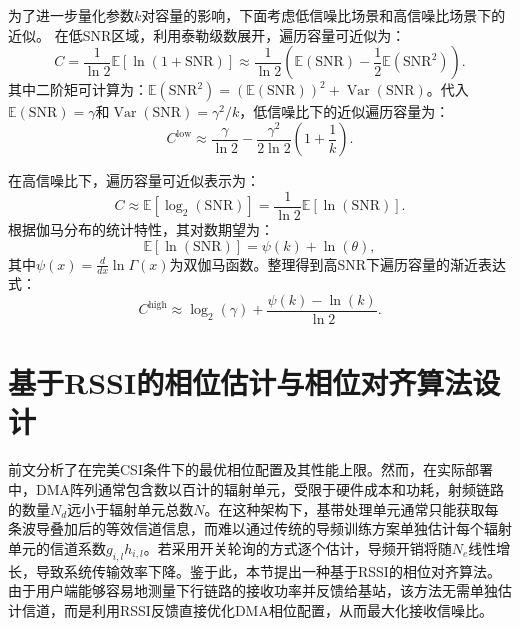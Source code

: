 为了进一步量化参数$k$对容量的影响，下面考虑低信噪比场景和高信噪比场景下的近似。
在低SNR区域，利用泰勒级数展开，遍历容量可近似为：
\begin{equation}
	C = \frac{1}{\ln 2} \mathbb{E}\left[ \ln(1 + \mathrm{SNR}) \right]
	\approx \frac{1}{\ln 2} \left( \mathbb{E}(\mathrm{SNR}) - \frac{1}{2}\mathbb{E}(\mathrm{SNR}^2) \right).
\end{equation}
其中二阶矩可计算为：$\mathbb{E}(\mathrm{SNR}^2)=(\mathbb{E}(\mathrm{SNR}))^2+\operatorname{Var}(\mathrm{SNR})$。代入$\mathbb{E}(\mathrm{SNR})=\gamma$和$\operatorname{Var}(\mathrm{SNR})=\gamma^2/k$，低信噪比下的近似遍历容量为：
\begin{equation}\label{eq:cdma_capacity_low_snr}
	C^{\text{low}} \approx \frac{\gamma}{\ln 2} - \frac{\gamma^2}{2 \ln 2} \left( 1 + \frac{1}{k} \right).
\end{equation}

在高信噪比下，遍历容量可近似表示为：
\begin{equation}
	C \approx \mathbb{E}\left[ \log_2(\mathrm{SNR}) \right] = \frac{1}{\ln 2} \mathbb{E}\left[ \ln(\mathrm{SNR}) \right].
\end{equation}
根据伽马分布的统计特性，其对数期望为：
\begin{equation}
	\mathbb{E}[\ln(\mathrm{SNR})] = \psi(k) + \ln(\theta),
\end{equation}
其中$\psi(x) = \frac{d}{dx}\ln \Gamma(x)$为双伽马函数。整理得到高SNR下遍历容量的渐近表达式：
\begin{equation}\label{eq:cdma_capacity_high_snr}
	C^{\text{high}}
	\approx \log_2(\gamma) + \frac{\psi(k) - \ln(k)}{\ln 2}.
\end{equation}


\section{基于RSSI的相位估计与相位对齐算法设计}\label{sec:cdma_rssi}

前文分析了在完美CSI条件下的最优相位配置及其性能上限。然而，在实际部署中，DMA阵列通常包含数以百计的辐射单元，受限于硬件成本和功耗，射频链路的数量$N_d$远小于辐射单元总数$N$。在这种架构下，基带处理单元通常只能获取每条波导叠加后的等效信道信息，而难以通过传统的导频训练方案单独估计每个辐射单元的信道系数$g_{i,l}h_{i,l}$。若采用开关轮询的方式逐个估计，导频开销将随$N_e$线性增长，导致系统传输效率下降。鉴于此，本节提出一种基于RSSI的相位对齐算法。由于用户端能够容易地测量下行链路的接收功率并反馈给基站，该方法无需单独估计信道，而是利用RSSI反馈直接优化DMA相位配置，从而最大化接收信噪比。

